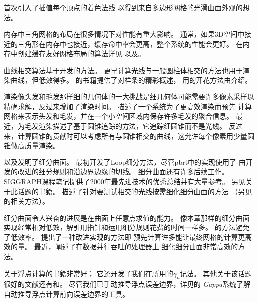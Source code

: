\citet{phong1975improved}首次引入了插值每个顶点的着色法线
以得到来自多边形网格的光滑曲面外观的想法。

内存中三角网格的布局在很多情况下对性能有重大影响。
通常，如果3D空间中接近的三角形在内存中也接近，缓存命中率会更高，整个系统的性能会更好。
在内存中创建缓存友好网格布局的算法详见
\citet{10.1145/1186822.1073278}以及\citet{4015484}。

曲线相交算法基于\citet{Nakamaru_raytracing}开发的方法。
更早计算光线与一般圆柱体相交的方法也用于渲染曲线，但低效得多\citep{10.1145/6116.6118,DeVoogt2000197}。
\citet{10.5555/501891}的书籍提供了对样条的精彩概述，
用的开花方法由\citet{ramshaw1987blossoming}介绍。

渲染像头发和毛发那样细的几何体的一大挑战是细几何体可能需要许多像素采样以精确求解，反过来增加了渲染时间。
\citet{10.1145/1179849.1179904}描述了一个系统为了更高效渲染而预先
计算网格来表示头发和毛发，并在一个小空间区域内保存许多毛发的聚合信息。
最近，\citet{6684531}为毛发渲染描述了基于圆锥追踪的方法，它追踪细圆锥而不是光线。
反过来，计算圆锥的贡献时可以考虑所有与圆锥相交的曲线，这允许每个像素用少量圆锥做高质量渲染。

\citet{DOO1978356}以及\citet{CATMULL1978350}发明了细分曲面。
\citet{loop1987smooth}最初开发了Loop细分方法，尽管pbrt中的实现使用了
由\citet{10.1145/192161.192233}开发的改进的细分规则和沿边界边缘的切线。
细分曲面还有许多后续工作。
SIGGRAPH课程笔记提供了2000年最先进技术的优秀总结并有大量参考\citep{zorin2000subdivision}。
另见\citet{WARREN20021}关于此话题的书籍。
\citet{10.1111/1467-8659.t01-2-00703}描述了针对要测试相交的光线按需细化细分曲面的方法
（另见\citet{SCI:Ben2007a}的相关方法）。

细分曲面令人兴奋的进展是在曲面上任意点求值的能力\citep{10.1145/280814.280945}。
像本章那样的细分曲面实现经常相对低效，解引用指针和运用细分规则花费的时间一样多。
\citeauthor{10.1145/280814.280945}的方法避免了低效率。
\citet{10.1145/504502.504505}提出了一种改进实现的方法即
预先计算许多能让最终网格的计算更高效的量。
最近，\citet{10.1145/1572769.1572785}阐述了在数据并行吞吐的处理器上
细化细分曲面非常高效的方法。

\citet{doi:10.1137/1.9780898718027}关于浮点计算的书籍非常好；
它还开发了我们在所用的$\gamma_n$记法。
其他关于该话题很好的文献还有\citet{10.5555/1096474}和\citet{10.1145/103162.103163}。
尽管我们已手动推导浮点误差边界，详见\citet{10.1145/1644001.1644003}的
\emph{Gappa}系统了解自动推导浮点计算前向误差边界的工具。

